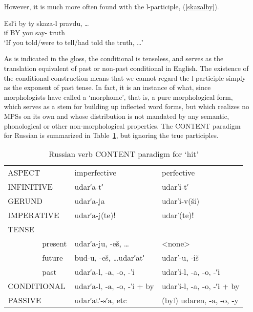 \documentclass[output=paper,
modfonts
]{LSP/langsci}
\begin{document}
\noindent However, it is much more often found with the l-participle, (\ref{skazalby}). 

\begin{minipage}{\linewidth}
\noindent\begin{exe} \ex \label{skazalby}

\gll	Eslʹi by ty skaza-l pravdu, \ldots\\
	if BY you say- truth\\
	‘If you told/were to tell/had told the truth, \ldots’
\end{exe}\end{minipage}\bigskip
 
\noindent
As is indicated in the gloss, the conditional is tenseless, and serves as the translation equivalent of past or non-past conditional in English.
The existence of the conditional construction means that we cannot regard the l-participle simply as the exponent of past tense. In fact, it is an instance of what, since \textcite{Aronoff94:book} morphologists have called a `morphome', 
that is,  a pure morphological form, which serves as a stem for building up inflected word forms, but which realizes no MPSs on its own and whose distribution is not mandated by any semantic, phonological or other non-morphological properties. The CONTENT paradigm for Russian is summarized in Table~\ref{table:RussCONTENT}, but ignoring the true participles. 

\begin{table} [h]
	\begin{center}
		\begin{tabular}{p{1em}p{3.5em}ll} \toprule
\multicolumn{2}{l}{ASPECT}		&imperfective					&perfective			\\\cmidrule(rl){3-4}
\multicolumn{2}{l}{INFINITIVE}		&udarʹa-tʹ 						&udarʹi-tʹ 			\\
\multicolumn{2}{l}{GERUND}		&udarʹa-ja						&udarʹi-v(ši)		\\
\multicolumn{2}{l}{IMPERATIVE}	&udarʹa-j(te)!				&udarʹ(te)!			\\
TENSE													\\
	&present	&udarʹa-ju, -eš, \ldots				&<none>			\\
	&future	 &bud-u, -eš, \ldots udarʹatʹ 			&udarʹ-u, -iš		\\
	&past		&udarʹa-l, -a, -o, -ʹi				&udarʹi-l, -a, -o, -ʹi		\\
\multicolumn{2}{l}{CONDITIONAL}	&udarʹa-l, -a, -o, -ʹi + by			&udarʹi-l, -a, -o, -ʹi + by	\\
\multicolumn{2}{l}{PASSIVE}	&udarʹatʹ-sʹa, etc					&(byl) udaren, -a, -o, -y	\\	\bottomrule
		\end{tabular}

\caption{Russian verb CONTENT paradigm for  ‘hit’}
	\label{table:RussCONTENT}

	\end{center}
\end{table}
\end{document}
